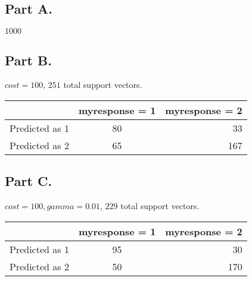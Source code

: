 \documentclass{article}
\begin{document}
\subsection*{Part A.}
$\boxed{1000}$ 
\subsection*{Part B.}
$cost = 100$, $251$ total support vectors.
      \begin{tabular}{|l|c|r|} 
        \hline
        & myresponse = 1 & myresponse = 2\\
        \hline
        Predicted as 1 & 80 & 33 \\
        \hline
        Predicted as 2 & 65 & 167 \\
        \hline
      \end{tabular}
\subsection*{Part C.}
$cost = 100, gamma = 0.01$, $229$ total support vectors.


      \begin{tabular}{|l|c|r|}
        \hline
        & myresponse = 1 & myresponse = 2\\
        \hline
        Predicted as 1 & 95 & 30\\
        \hline
        Predicted as 2 & 50 & 170\\
        \hline
      \end{tabular}

 

\end{document}
